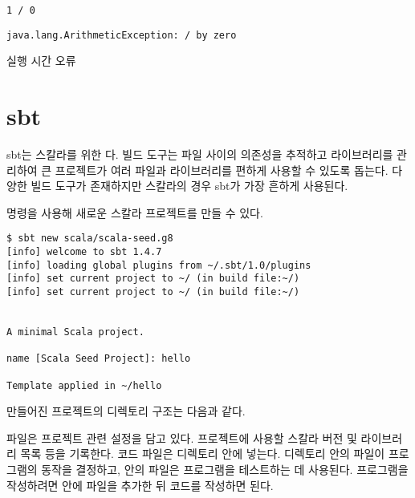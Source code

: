 \begin{verbatim}
1 / 0
\end{verbatim}
\vspace{-1em}
\begin{mdframed}[hidealllines=true,backgroundcolor=gray!10,innerleftmargin=3pt,innerrightmargin=3pt,leftmargin=-3pt,rightmargin=-3pt]
\begin{verbatim}
java.lang.ArithmeticException: / by zero
\end{verbatim}
\vspace{-2em}
\begin{flushright}
\scriptsize\textsf{실행 시간 오류}
\end{flushright}
\end{mdframed}

\section{sbt}

sbt는 스칼라를 위한 다. 빌드 도구는 파일 사이의 의존성을 추적하고
라이브러리를 관리하여 큰 프로젝트가 여러 파일과 라이브러리를 편하게 사용할 수 있도록
돕는다. 다양한 빌드 도구가 존재하지만 스칼라의 경우 sbt가 가장 흔하게 사용된다.

 명령을 사용해 새로운 스칼라 프로젝트를 만들 수 있다.

\begin{verbatim}
$ sbt new scala/scala-seed.g8
[info] welcome to sbt 1.4.7
[info] loading global plugins from ~/.sbt/1.0/plugins
[info] set current project to ~/ (in build file:~/)
[info] set current project to ~/ (in build file:~/)


A minimal Scala project.

name [Scala Seed Project]: hello

Template applied in ~/hello
\end{verbatim}

만들어진 프로젝트의 디렉토리 구조는 다음과 같다.


 파일은 프로젝트 관련 설정을 담고 있다. 프로젝트에 사용할 스칼라 버전
및 라이브러리 목록 등을 기록한다. 코드 파일은  디렉토리 안에 넣는다.
디렉토리 안의 파일이 프로그램의 동작을 결정하고,  안의 파일은 프로그램을
테스트하는 데 사용된다. 프로그램을 작성하려면  안에 파일을 추가한
뒤 코드를 작성하면 된다.

